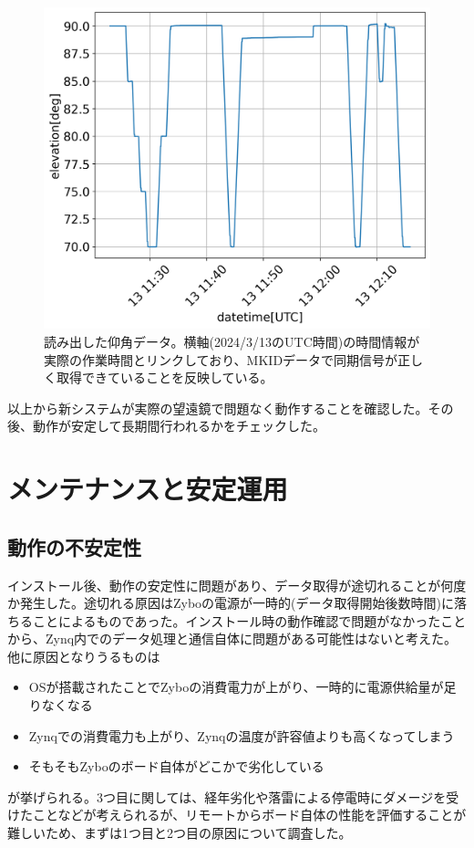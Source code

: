 \begin{figure}[htbp]
  \centering
  \includegraphics[width=0.8\columnwidth]{4_elDAQ/figs/elevation_data.png}
  \caption{読み出した仰角データ。横軸(2024/3/13のUTC時間)の時間情報が実際の作業時間とリンクしており、MKIDデータで同期信号が正しく取得できていることを反映している。}
  \label{elevation_data}
\end{figure}

以上から新システムが実際の望遠鏡で問題なく動作することを確認した。その後、動作が安定して長期間行われるかをチェックした。

\section{メンテナンスと安定運用}

\subsection{動作の不安定性}
インストール後、動作の安定性に問題があり、データ取得が途切れることが何度か発生した。途切れる原因はZyboの電源が一時的(データ取得開始後数時間)に落ちることによるものであった。インストール時の動作確認で問題がなかったことから、Zynq内でのデータ処理と通信自体に問題がある可能性はないと考えた。他に原因となりうるものは
\begin{itemize}
  \item OSが搭載されたことでZyboの消費電力が上がり、一時的に電源供給量が足りなくなる
  \item Zynqでの消費電力も上がり、Zynqの温度が許容値よりも高くなってしまう
  \item そもそもZyboのボード自体がどこかで劣化している
\end{itemize}
が挙げられる。3つ目に関しては、経年劣化や落雷による停電時にダメージを受けたことなどが考えられるが、リモートからボード自体の性能を評価することが難しいため、まずは1つ目と2つ目の原因について調査した。

